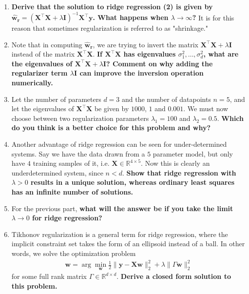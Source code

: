 \documentclass{article}\usepackage[utf8]{inputenc}\usepackage[margin=0.4cm,top=0.4cm,bottom=0.4cm]{geometry}\usepackage[usenames,dvipsnames,svgnames,table]{xcolor}
\begin{document}
\begin{enumerate}
\EndSolution
\item \textbf{Derive that the solution to ridge regression (2) is given by $\mathbf{\hat{w}_{r}} = (\mathbf{X}^\top \mathbf{X} + \lambda \mathbf{I})^{-1} \mathbf{X}^\top \mathbf{y}$. What happens when $\lambda \to \infty$?} It is for this reason that sometimes regularization is referred to as "shrinkage."
\BeginSolution

\EndSolution
\item Note that in computing $\mathbf{\hat{w}_r}$, we are trying to invert the matrix $\mathbf{X}^\top \mathbf{X} + \lambda \mathbf{I}$ instead of the matrix $\mathbf{X}^\top \mathbf{X}$. \textbf{If $\mathbf{X}^\top \mathbf{X}$ has eigenvalues $\sigma_1^2, \ldots, \sigma_d^2$, what are the eigenvalues of $\mathbf{X}^\top \mathbf{X} + \lambda \mathbf{I}$? Comment on why adding the regularizer term $\lambda \mathbf{I}$ can improve the inversion operation numerically.}
\BeginSolution

\EndSolution
\item Let the number of parameters $d = 3$ and the number of datapoints $n = 5$, and let the eigenvalues of $\mathbf{X}^\top \mathbf{X}$ be given by $1000$, $1$ and $0.001$. We must now choose between two regularization parameters $\lambda_1 = 100$ and $\lambda_2 = 0.5$. \textbf{Which do you think is a better choice for this problem and why?}
\BeginSolution

\EndSolution
\item Another advantage of ridge regression can be seen for under-determined systems. Say we have the data drawn from a $5$ parameter model, but only have $4$ training samples of it, i.e. $\mathbf{X} \in \mathbb{R}^{4 \times 5}$. Now this is clearly an underdetermined system, since $n < d$. \textbf{Show that ridge regression with $\lambda > 0$ results in a unique solution, whereas ordinary least squares has an infinite number of solutions.}
\BeginSolution

\EndSolution
\item For the previous part, \textbf{what will the answer be if you take the limit $\lambda \rightarrow 0$ for ridge regression? }
\BeginSolution

\EndSolution
\item Tikhonov regularization is a general term for ridge regression, where the implicit constraint set takes the form of an ellipsoid instead of a ball. In other words, we solve the optimization problem \begin{align*}\mathbf{w}=\arg\min_\mathbf{w}\frac{1}{2}\|\mathbf{y}-\mathbf{X}\mathbf{w}\|_2^2+\lambda\|\Gamma\mathbf{w}\|_2^2\end{align*} for some full rank matrix $\Gamma \in \mathbb{R}^{d \times d}$. \textbf{Derive a closed form solution to this problem.}
\BeginSolution

\EndSolution
\end{enumerate}
\clearpage
\end{document}
